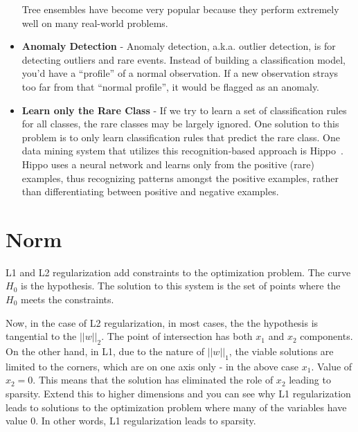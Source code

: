\documentclass{book}
\begin{document}
\begin{itemize}
Tree ensembles have become very popular because they perform extremely well on many real-world problems.

\item \textbf{Anomaly Detection} - Anomaly detection, a.k.a. outlier detection, is for detecting outliers and rare events. Instead of building a classification model, you'd have a ``profile'' of a normal observation. If a new observation strays too far from that ``normal profile'', it would be flagged as an anomaly.

\item \textbf{Learn only the Rare Class} - 
If we try to learn a set of classification rules for all classes, the rare classes may be largely ignored. One solution to this problem is to only learn classification rules that predict the rare class. One data mining system that utilizes this recognition-based approach is Hippo~\cite{DBLP:conf/ijcai/JapkowiczMG95, DBLP:journals/sigkdd/Weiss04}. Hippo uses a neural network and learns only from the positive (rare) examples, thus recognizing patterns amongst the positive examples, rather than differentiating between positive and negative examples.
\end{itemize}

\section{Norm}
L1 and L2 regularization add constraints to the optimization problem. The curve $H_0$ is the hypothesis. The solution to this system is the set of points where the $H_0$ meets the constraints.

Now, in the case of L2 regularization, in most cases, the the hypothesis is tangential to the $||w||_2$. The point of intersection has both $x_1$ and $x_2$ components. On the other hand, in L1, due to the nature of $||w||_1$, the viable solutions are limited to the corners, which are on one axis only - in the above case $x_1$. Value of $x_2 = 0$. This means that the solution has eliminated the role of $x_2$ leading to sparsity. Extend this to higher dimensions and you can see why L1 regularization leads to solutions to the optimization problem where many of the variables have value $0$.
In other words, L1 regularization leads to sparsity.
\end{document}
